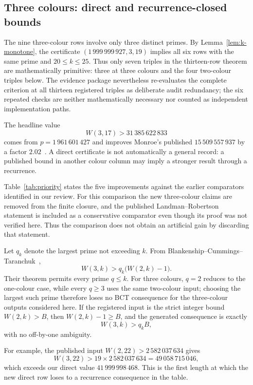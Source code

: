\subsection{Three colours: direct and recurrence-closed bounds}\label{ss:r3}

The nine three-colour rows involve only three distinct primes. By
Lemma~\ref{lem:k-monotone}, the certificate
$(1\,999\,999\,927,3,19)$ implies all six rows with the same prime and
$20\le k\le25$. Thus only seven triples in the thirteen-row theorem are
mathematically primitive: three at three colours and the four two-colour
triples below. The evidence package nevertheless re-evaluates the complete
criterion at all thirteen registered triples as deliberate audit redundancy;
the six repeated checks are neither mathematically necessary nor counted as
independent implementation paths.

The headline value
\[
  W(3,17)>31\,385\,622\,833
\]
comes from $p=1\,961\,601\,427$ and improves Monroe's published
$15\,509\,557\,937$ by a factor $2.02$~\cite{Monroe2026}.  A direct
certificate is not automatically a general record: a published bound in
another colour column may imply a stronger result through a recurrence.

Table~\ref{tab:priority} states the five improvements against the earlier
comparators identified in our review. For this comparison the new three-colour
claims are removed from the finite closure, and the published
Landman--Robertson statement is included as a conservative comparator even
though its proof was not verified here. Thus the comparison does not obtain
an artificial gain by discarding that statement.



Let $q_k$ denote the largest prime not exceeding $k$.  From
Blankenship--Cummings--Taranchuk~\cite[Theorem~2.1]{bct2018},
\[
  W(3,k)>q_k\bigl(W(2,k)-1\bigr).
\]
Their theorem permits every prime $q\le k$. For three colours, $q=2$ reduces
to the one-colour case, while every $q\ge3$ uses the same two-colour input;
choosing the largest such prime therefore loses no BCT consequence for the
three-colour outputs considered here.
If the registered input is the strict integer bound $W(2,k)>B$, then
$W(2,k)-1\ge B$, and the generated consequence is exactly
\begin{equation}\label{eq:bct-r3}
  W(3,k)>q_k B,
\end{equation}
with no off-by-one ambiguity.

For example, the published input $W(2,22)>2\,582\,037\,634$ gives
\[
 W(3,22)>19\times2\,582\,037\,634=49\,058\,715\,046,
\]
which exceeds our direct value $41\,999\,998\,468$. This is the first length
at which the new direct row loses to a recurrence consequence in the table.

